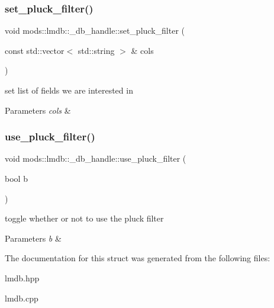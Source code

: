 \subsubsection{\texorpdfstring{set\+\_\+pluck\+\_\+filter()}{set\_pluck\_filter()}}
{\footnotesize\ttfamily void mods\+::lmdb\+::\+\_\+db\+\_\+handle\+::set\+\_\+pluck\+\_\+filter (\begin{DoxyParamCaption}\item[{const std\+::vector$<$ std\+::string $>$ \&}]{cols }\end{DoxyParamCaption})}



set list of fields we are interested in 


\begin{DoxyParams}{Parameters}
{\em cols} & \\
\hline
\end{DoxyParams}
\mbox{\label{structmods_1_1lmdb_1_1__db__handle_abc6d0f79407e4bc1893dedd4005d214c}} 
\subsubsection{\texorpdfstring{use\+\_\+pluck\+\_\+filter()}{use\_pluck\_filter()}}
{\footnotesize\ttfamily void mods\+::lmdb\+::\+\_\+db\+\_\+handle\+::use\+\_\+pluck\+\_\+filter (\begin{DoxyParamCaption}\item[{bool}]{b }\end{DoxyParamCaption})}



toggle whether or not to use the pluck filter 


\begin{DoxyParams}{Parameters}
{\em b} & \\
\hline
\end{DoxyParams}


The documentation for this struct was generated from the following files\+:\begin{DoxyCompactItemize}
\item 
lmdb.\+hpp\item 
lmdb.\+cpp\end{DoxyCompactItemize}
